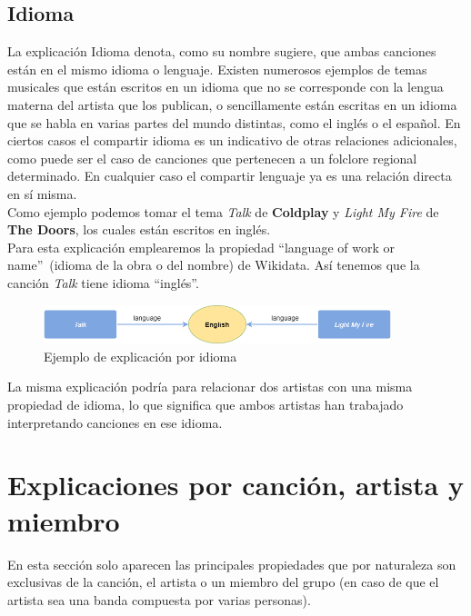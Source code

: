 \subsection*{Idioma}

La explicación Idioma denota, como su nombre sugiere, que ambas canciones están en el mismo idioma o lenguaje. Existen numerosos ejemplos de temas musicales que están escritos en un idioma que no se corresponde con la lengua materna del artista que los publican, o sencillamente están escritas en un idioma que se habla en varias partes del mundo distintas, como el inglés o el español. En ciertos casos el compartir idioma es un indicativo de otras relaciones adicionales, como puede ser el caso de canciones que pertenecen a un folclore regional determinado. En cualquier caso el compartir lenguaje ya es una relación directa en sí misma.\\

Como ejemplo podemos tomar el tema \textit{Talk} de \textbf{Coldplay} y \textit{Light My Fire} de \textbf{The Doors}, los cuales están escritos en inglés.\\

Para esta explicación emplearemos la propiedad ``language of work or name''~(idioma de la obra o del nombre) de Wikidata. Así tenemos que la canción \textit{Talk} tiene idioma ``inglés''.\\

\begin{figure}[h!]
	\centering
	\includegraphics[width = 0.9\textwidth]{Imagenes/Bitmap/Idioma ejemplo.png}
	\caption{Ejemplo de explicación por idioma}
	\label{fig:sampleImage}
\end{figure}

La misma explicación podría para relacionar dos artistas con una misma propiedad de idioma, lo que significa que ambos artistas han trabajado interpretando canciones en ese idioma.\\

\section{Explicaciones por canción, artista y miembro}

En esta sección solo aparecen las principales propiedades que por naturaleza son exclusivas de la canción, el artista o un miembro del grupo (en caso de que el artista sea una banda compuesta por varias personas).\\

